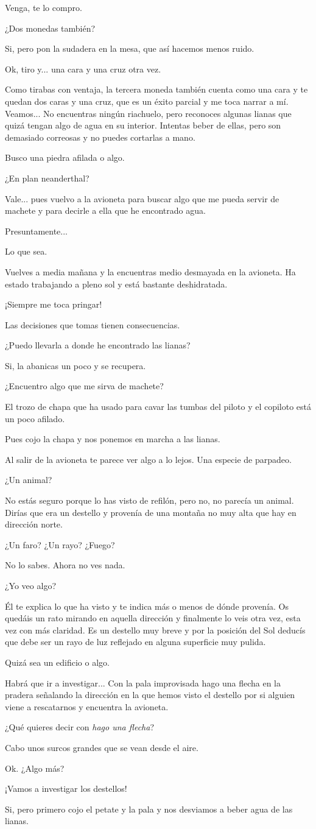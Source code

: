 \documentclass[10pt, a5paper, twocolumn]{article}
\newcommand\E{\item[\raisebox{-0.25em}{\scalebox{0.75}{\bcicosaedre}}]}
\newcommand\B{\item[\raisebox{-0.25em}{\scalebox{0.75}{\bccube}}]}
\newcommand\A{\item[\raisebox{-0.25em}{\scalebox{0.75}{\bctetraedre}}]}
\newenvironment{dialogue}
    {\begin{description}[leftmargin=!,align=right,labelwidth=0.cm]}
    {\end{description}}
\begin{document}
\begin{dialogue}
        \E Venga, te lo compro.
        \B ¿Dos monedas también?
        \E Si, pero pon la sudadera en la mesa, que así hacemos menos ruido.
        \B Ok, tiro y... una cara y una cruz otra vez.
        \E Como tirabas con ventaja, la tercera moneda también cuenta como una cara y te quedan dos caras y una cruz, que es un éxito parcial y me toca narrar a mí. Veamos... No encuentras ningún riachuelo, pero reconoces algunas lianas que quizá tengan algo de agua en su interior. Intentas beber de ellas, pero son demasiado correosas y no puedes cortarlas a mano.
        \B Busco una piedra afilada o algo.
        \E ¿En plan neanderthal?
        \B Vale... pues vuelvo a la avioneta para buscar algo que me pueda servir de machete y para decirle a ella que he encontrado agua.
        \E Presuntamente...
        \B Lo que sea.
        \E Vuelves a media mañana y la encuentras medio desmayada en la avioneta. Ha estado trabajando a pleno sol y está bastante deshidratada.
        \A ¡Siempre me toca pringar!
        \E Las decisiones que tomas tienen consecuencias.
        \B ¿Puedo llevarla a donde he encontrado las lianas?
        \E Si, la abanicas un poco y se recupera.
        \B ¿Encuentro algo que me sirva de machete?
        \E El trozo de chapa que ha usado para cavar las tumbas del piloto y el copiloto está un poco afilado.
        \B Pues cojo la chapa y nos ponemos en marcha a las lianas.
        \E Al salir de la avioneta te parece ver algo a lo lejos. Una especie de parpadeo.
        \B ¿Un animal?
        \E No estás seguro porque lo has visto de refilón, pero no, no parecía un animal. Dirías que era un destello y provenía de una montaña no muy alta que hay en dirección norte.
        \B ¿Un faro? ¿Un rayo? ¿Fuego?
        \E No lo sabes. Ahora no ves nada.
        \A ¿Yo veo algo?
        \E Él te explica lo que ha visto y te indica más o menos de dónde provenía. Os quedáis un rato mirando en aquella dirección y finalmente lo veis otra vez, esta vez con más claridad. Es un destello muy breve y por la posición del Sol deducís que debe ser un rayo de luz reflejado en alguna superficie muy pulida.
        \A Quizá sea un edificio o algo.
        \B Habrá que ir a investigar... Con la pala improvisada hago una flecha en la pradera señalando la dirección en la que hemos visto el destello por si alguien viene a rescatarnos y encuentra la avioneta.
        \E ¿Qué quieres decir con \emph{hago una flecha}?
        \B Cabo unos surcos grandes que se vean desde el aire.
        \E Ok. ¿Algo más?
        \A ¡Vamos a investigar los destellos!
        \B Si, pero primero cojo el petate y la pala y nos desviamos a beber agua de las lianas.

\end{dialogue}
\end{document}
